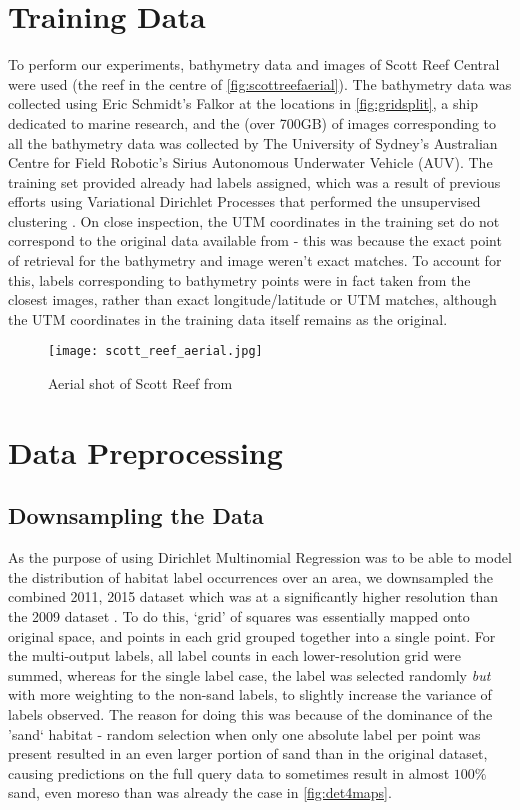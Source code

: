 \section{Training Data}
To perform our experiments, bathymetry data and images of Scott Reef Central were used (the reef in the centre of \autoref{fig:scottreefaerial}). The bathymetry data was collected using Eric Schmidt's Falkor at the locations in \autoref{fig:gridsplit}, a ship dedicated to marine research, and the (over 700GB) of images corresponding to all the bathymetry data was collected by The University of Sydney's Australian Centre for Field Robotic's Sirius Autonomous Underwater Vehicle (AUV). The training set provided already had labels assigned, which was a result of previous efforts using Variational Dirichlet Processes that performed the unsupervised clustering \citep{steinberg11}.  On close inspection, the UTM coordinates in the training set do not correspond to the original data available from \cite{squidle} - this was because the exact point of retrieval for the bathymetry and image weren't exact matches. To account for this, labels corresponding to bathymetry points were in fact taken from the closest images, rather than exact longitude/latitude or UTM matches, although the UTM coordinates in the training data itself remains as the original. 

\begin{figure}
    \texttt{[image: scott\_reef\_aerial.jpg]}
    \caption{Aerial shot of Scott Reef from \cite{NASA:SRI}}
    \label{fig:scottreefaerial}
\end{figure}

\section{Data Preprocessing}

\subsection{Downsampling the Data}
As the purpose of using Dirichlet Multinomial Regression was to be able to model the distribution of habitat label occurrences over an area, we downsampled the combined 2011, 2015 dataset which was at a significantly higher resolution than the 2009 dataset . To do this, `grid' of squares was essentially mapped onto original space, and points in each grid grouped together into a single point. For the multi-output labels, all label counts in each lower-resolution grid were summed, whereas for the single label case, the label was selected randomly \textit{but} with more weighting to the non-sand labels, to slightly increase the variance of labels observed. The reason for doing this was because of the dominance of the 'sand` habitat - random selection when only one absolute label per point was present resulted in an even larger portion of sand than in the original dataset, causing predictions on the full query data to sometimes result in almost $100\%$ sand, even moreso than was already the case in \autoref{fig:det4maps}.

